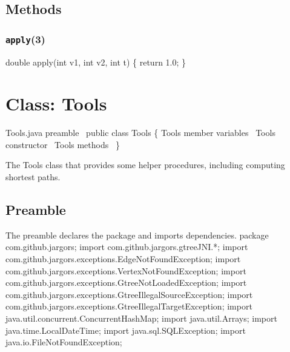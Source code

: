 \section{Methods}

\subsection{\texttt{apply}(3)}
\nwenddocs{}\endmoddef{}
double apply(int v1, int v2, int t) \{
  return 1.0;
\}
\eatline
{}\nwendcode{}\nwdocspar

\nwenddocs{}\chapter{Class: Tools}
\label{tools}

\nwenddocs{}\endmoddef{}
\LA{}Tools.java preamble~{\nwtagstyle{}}\RA{}
public class Tools \{
  \LA{}\code{}Tools\edoc{} member variables~{\nwtagstyle{}}\RA{}
  \LA{}\code{}Tools\edoc{} constructor~{\nwtagstyle{}}\RA{}
  \LA{}\code{}Tools\edoc{} methods~{\nwtagstyle{}}\RA{}
\}
\nwendcode{}\nwdocspar

The Tools class that provides some helper procedures, including computing
shortest paths.

\section{Preamble}
The preamble declares the package and imports dependencies.
\nwenddocs{}\endmoddef{}
package com.github.jargors;
import com.github.jargors.gtreeJNI.*;
import com.github.jargors.exceptions.EdgeNotFoundException;
import com.github.jargors.exceptions.VertexNotFoundException;
import com.github.jargors.exceptions.GtreeNotLoadedException;
import com.github.jargors.exceptions.GtreeIllegalSourceException;
import com.github.jargors.exceptions.GtreeIllegalTargetException;
import java.util.concurrent.ConcurrentHashMap;
import java.util.Arrays;
import java.time.LocalDateTime;
import java.sql.SQLException;
import java.io.FileNotFoundException;
\nwendcode{}\nwdocspar

